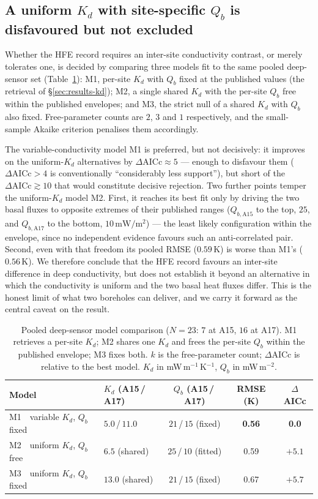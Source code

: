 \documentclass[11pt]{article}
\begin{document}
\subsection{A uniform $K_d$ with site-specific $Q_b$ is disfavoured
but not excluded}\label{sec:disc-modelcomp}
Whether the HFE record requires an inter-site conductivity
contrast, or merely tolerates one, is decided by comparing three
models fit to the same pooled deep-sensor set
(Table~\ref{tab:modelcomp}):
M1, per-site $K_d$ with $Q_b$ fixed at the published values (the
retrieval of \S\ref{sec:results-kd}); M2, a single shared
$K_d$ with the per-site $Q_b$ free within the published
\citet{langseth1976,saito2007,nagihara2018} envelopes; and M3, the
strict null of a shared $K_d$ with $Q_b$ also fixed. Free-parameter
counts are $2$, $3$ and $1$ respectively, and the small-sample
Akaike criterion penalises them accordingly.

The variable-conductivity model M1 is preferred, but not decisively:
it improves on the uniform-$K_d$ alternatives by
$\Delta\mathrm{AICc}\approx5$ --- enough to disfavour them
($\Delta\mathrm{AICc}>4$ is conventionally ``considerably less
support''), but short of the $\Delta\mathrm{AICc}\gtrsim10$ that would
constitute decisive rejection. Two further points temper the
uniform-$K_d$ model M2. First, it reaches its best fit only by
driving the two basal fluxes to opposite extremes of their
published ranges ($Q_{b,\mathrm{A15}}$ to the top, $25$, and
$Q_{b,\mathrm{A17}}$ to the bottom, $10\,\si{\milli\watt\per\meter\squared}$)
--- the least likely configuration within the envelope, since no
independent evidence favours such an anti-correlated pair. Second,
even with that freedom its pooled RMSE ($0.59$\,K) is worse than M1's
($0.56$\,K). We therefore conclude that the HFE record favours
an inter-site difference in deep conductivity, but does not establish
it beyond an alternative in which the conductivity is uniform and the
two basal heat fluxes differ. This is the honest limit of what two
boreholes can deliver, and we carry it forward as the central caveat
on the result.

\begin{table}[!htbp]
\centering
\small
\caption{Pooled deep-sensor model comparison ($N=23$: $7$ at A15,
$16$ at A17). M1 retrieves a per-site $K_d$; M2 shares one $K_d$ and
frees the per-site $Q_b$ within the published envelope; M3 fixes
both. $k$ is the free-parameter count; $\Delta$AICc is relative to
the best model. $K_d$ in mW\,m$^{-1}$\,K$^{-1}$, $Q_b$ in
mW\,m$^{-2}$.}
\label{tab:modelcomp}
\begin{tabular}{llccc}
\toprule
Model & $K_d$ (A15\,/\,A17) & $Q_b$ (A15\,/\,A17) & RMSE (K) & $\Delta$AICc \\
\midrule
M1\ \ variable $K_d$, $Q_b$ fixed & $5.0$\,/\,$11.0$ & $21$\,/\,$15$ (fixed) & \textbf{0.56} & \textbf{0.0} \\
M2\ \ uniform $K_d$, $Q_b$ free   & $6.5$ (shared)   & $25$\,/\,$10$ (fitted) & 0.59 & $+5.1$ \\
M3\ \ uniform $K_d$, $Q_b$ fixed  & $13.0$ (shared)  & $21$\,/\,$15$ (fixed) & 0.67 & $+5.7$ \\
\bottomrule
\end{tabular}
\end{table}
\end{document}
